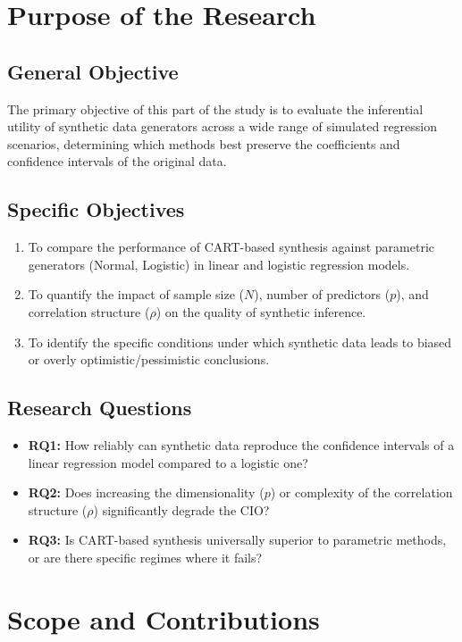 \section{Purpose of the Research}
\label{sec:reg-purpose}

\subsection{General Objective}
The primary objective of this part of the study is to evaluate the inferential utility of synthetic data generators across a wide range of simulated regression scenarios, determining which methods best preserve the coefficients and confidence intervals of the original data.

\subsection{Specific Objectives}
\begin{enumerate}
    \item To compare the performance of CART-based synthesis against parametric generators (Normal, Logistic) in linear and logistic regression models.
    \item To quantify the impact of sample size ($N$), number of predictors ($p$), and correlation structure ($\rho$) on the quality of synthetic inference.
    \item To identify the specific conditions under which synthetic data leads to biased or overly optimistic/pessimistic conclusions.
\end{enumerate}

\subsection{Research Questions}
\begin{itemize}
    \item \textbf{RQ1:} How reliably can synthetic data reproduce the confidence intervals of a linear regression model compared to a logistic one?
    \item \textbf{RQ2:} Does increasing the dimensionality ($p$) or complexity of the correlation structure ($\rho$) significantly degrade the CIO?
    \item \textbf{RQ3:} Is CART-based synthesis universally superior to parametric methods, or are there specific regimes where it fails?
\end{itemize}

\section{Scope and Contributions}
\label{sec:reg-scope}

